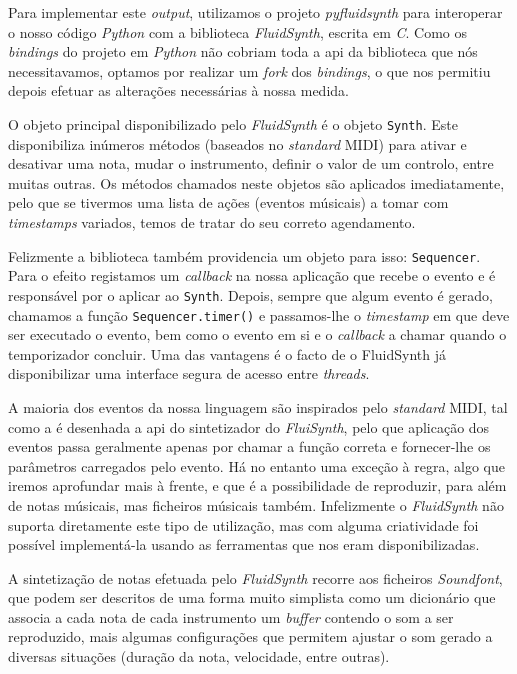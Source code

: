 Para implementar este \textit{output}, utilizamos o projeto \textit{pyfluidsynth}\cite{pyfluidsynth} para interoperar o nosso código \textit{Python} com a biblioteca \textit{FluidSynth}, escrita em \textit{C}. Como os \textit{bindings} do projeto em \textit{Python} não cobriam toda a \acrshort{api} da biblioteca que nós necessitavamos, optamos por realizar um \textit{fork} dos \textit{bindings}, o que nos permitiu depois efetuar as alterações necessárias à nossa medida.

O objeto principal disponibilizado pelo \textit{FluidSynth} é o objeto \texttt{Synth}. Este disponibiliza inúmeros métodos (baseados no \textit{standard} MIDI) para ativar e desativar uma nota, mudar o instrumento, definir o valor de um controlo, entre muitas outras. Os métodos chamados neste objetos são aplicados imediatamente, pelo que se tivermos uma lista de ações (eventos músicais) a tomar com \textit{timestamps} variados, temos de tratar do seu correto agendamento.

Felizmente a biblioteca também providencia um objeto para isso: \texttt{Sequencer}.  Para o efeito registamos um \textit{callback} na nossa aplicação que recebe o evento e é responsável por o aplicar ao \texttt{Synth}. Depois, sempre que algum evento é gerado, chamamos a função \texttt{Sequencer.timer()} e passamos-lhe o \textit{timestamp} em que deve ser executado o evento, bem como o evento em si e o \textit{callback} a chamar quando o temporizador concluir. Uma das vantagens é o facto de o FluidSynth já disponibilizar uma interface segura de acesso entre \textit{threads}\cite{henningsson2011fluidsynth}.

A maioria dos eventos da nossa linguagem são inspirados pelo \textit{standard} MIDI, tal como a é desenhada a \acrshort{api} do sintetizador do \textit{FluiSynth}, pelo que aplicação dos eventos passa geralmente apenas por chamar a função correta e fornecer-lhe os parâmetros carregados pelo evento. Há no entanto uma exceção à regra, algo que iremos aprofundar mais à frente, e que é a possibilidade de reproduzir, para além de notas músicais, mas ficheiros músicais também. Infelizmente o \textit{FluidSynth} não suporta diretamente este tipo de utilização, mas com alguma criatividade foi possível implementá-la usando as ferramentas que nos eram disponibilizadas.

A sintetização de notas efetuada pelo \textit{FluidSynth} recorre aos ficheiros \textit{Soundfont}, que podem ser descritos de uma forma muito simplista como um dicionário que associa a cada nota de cada instrumento um \textit{buffer} contendo o som a ser reproduzido, mais algumas configurações que permitem ajustar o som gerado a diversas situações (duração da nota, velocidade, entre outras).

